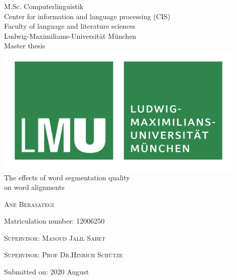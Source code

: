 %
%

\begin{titlepage}
	\begin{center}
		\normalsize
		M.Sc. Computerlinguistik \\
		Center for information and language processing (CIS)  \\
		Faculty of language and literature sciences \\
		Ludwig-Maximiliams-Universität München \\
		\vspace{1cm} %
		\huge
		Master thesis \\
		\vspace{1.5cm}
		\includegraphics[width=12cm]{figures/lmu_logo.png} \\ %
		\vspace{1cm}
		\Huge 
		The effects of word segmentation quality \\
		on word alignments \\
		\vspace{1cm}
		{\Large\scshape Ane Berasategi \par}
		\normalsize
		{Matriculation number: 12006250 \par}
		\vfill
		\vspace{1.5cm}
		{\scshape Supervisor: Masoud Jalil Sabet \par}
		{\scshape Supervisor: Prof Dr.Hinrich Schütze \par}
		{Submitted on: 2020 August \par} %
		\vspace{1cm}
	\end{center}
	\vfill %
\end{titlepage}

